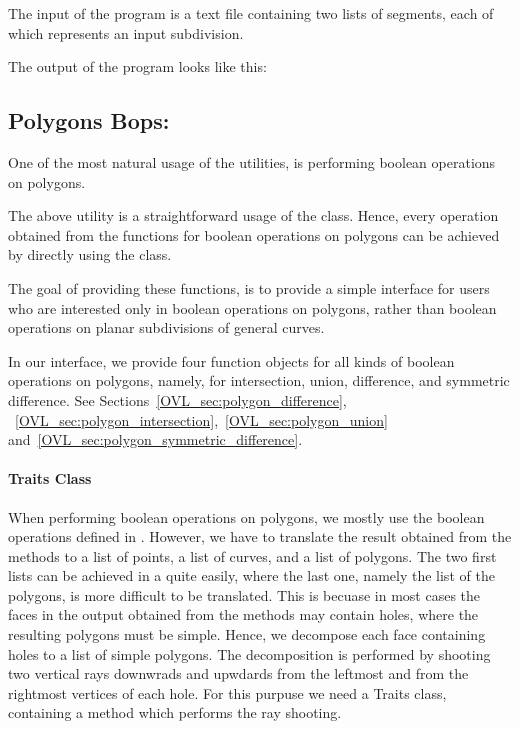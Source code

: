 The input of the program is a text file containing two lists of segments, 
each of which represents an input subdivision.

The output of the program looks like this:


\subsection*{Polygons Bops:}
One of the most natural usage of 
the  utilities, 
is performing boolean operations on polygons.

The above utility is a straightforward usage of the 
class. Hence, every operation obtained from the functions 
for boolean operations on polygons can be achieved by 
directly using the  
class. 

The goal of providing these functions, is to 
provide a simple interface for users who are 
interested only in boolean operations on 
polygons, rather than boolean operations 
on planar subdivisions of general curves.

In our interface, we provide four function objects 
for all kinds of boolean operations on polygons,
namely, for intersection, union, difference, and 
symmetric difference.
See Sections~\ref{OVL_sec:polygon_difference},
~\ref{OVL_sec:polygon_intersection},~\ref{OVL_sec:polygon_union} 
and~\ref{OVL_sec:polygon_symmetric_difference}. 

\paragraph{Traits Class}
When performing boolean operations on polygons, 
we mostly use the boolean operations defined in 
.
However, we have to translate the result obtained from the 
 methods to a list 
of points, a list of curves, and a list of polygons.
The two first lists can be achieved in a quite easily,
where the last one, namely the list of the polygons,
is more difficult to be translated. This is becuase 
in most cases the faces in the output obtained from the 
 methods may contain holes,
where the resulting polygons must be simple.
Hence, we decompose each face containing holes to a list 
of simple polygons. The decomposition is performed by shooting 
two vertical rays downwrads and upwdards from the leftmost 
and from the rightmost vertices of each hole. 
For this purpuse we need a Traits class, containing a method 
which performs the ray shooting. 


